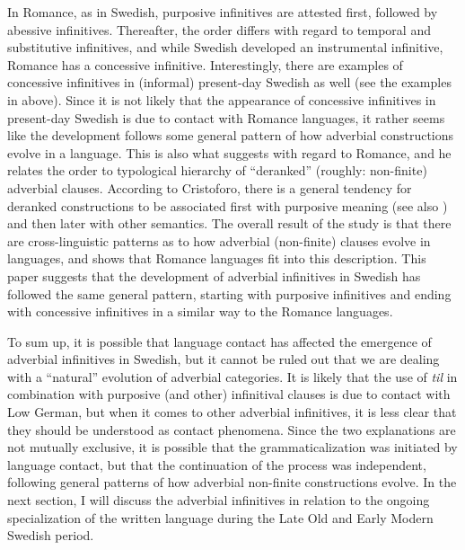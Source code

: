 \documentclass[output=paper]{langscibook}
\begin{document}
In Romance, as in Swedish, purposive infinitives are attested first, followed by abessive infinitives. Thereafter, the order differs with regard to temporal and substitutive infinitives, and while Swedish developed an instrumental infinitive, Romance has a concessive infinitive. Interestingly, there are examples of concessive infinitives in (informal) present-day Swedish as well (see the examples in  above). Since it is not likely that the appearance of concessive infinitives in present-day Swedish is due to contact with Romance languages, it rather seems like the development follows some general pattern of how adverbial constructions evolve in a language. This is also what \citet{Schulte2007Prepositional, Schulte2007What} suggests with regard to Romance, and he relates the order to  typological hierarchy of “deranked” (roughly: non-finite) adverbial clauses. According to Cristoforo, there is a general tendency for deranked constructions to be associated first with purposive meaning (see also \citealt{Haspelmath1989}) and then later with other semantics. The overall result of the study is that there are cross-linguistic patterns as to how adverbial (non-finite) clauses evolve in languages, and \citet{Schulte2007Prepositional, Schulte2007What} shows that Romance languages fit into this description. This paper suggests that the development of adverbial infinitives in Swedish has followed the same general pattern, starting with purposive infinitives and ending with concessive infinitives in a similar way to the Romance languages.



To sum up, it is possible that language contact has affected the emergence of adverbial infinitives in Swedish, but it cannot be ruled out that we are dealing with a “natural” evolution of adverbial categories. It is likely that the use of \textit{til} in combination with purposive (and other) infinitival clauses is due to contact with Low German, but when it comes to other adverbial infinitives, it is less clear that they should be understood as contact phenomena. Since the two explanations are not mutually exclusive, it is possible that the grammaticalization was initiated by language contact, but that the continuation of the process was independent, following general patterns of how adverbial non-finite constructions evolve. In the next section, I will discuss the adverbial infinitives in relation to the ongoing specialization of the written language during the Late Old and Early Modern Swedish period. 
\end{document}
